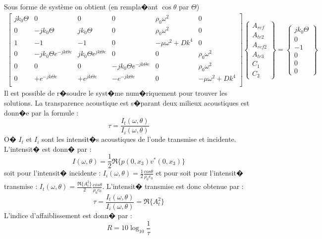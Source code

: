 \documentclass[12pt,foolscap]{report}
\begin{document}
{{Sous forme de système on obtient (en rempla�ant $\cos \theta$ par $\Theta$)
\begin{align}	
\begin{bmatrix}
j k_0 \Theta    &0 & 0 &0&\rho_0\omega^2&0  \\
0       & -j k_0 \Theta & j k_0 \Theta & 0 &\rho_0\omega^2 & 0  \\
1       & -1 & -1 & 0 &-\mu \omega^2+Dk^4 & 0  \\
0    &-j k_0 \Theta e^{-jk\Theta e}   & j k_0 \Theta e^{jk\Theta e}   &0&0&\rho_0\omega^2  \\
0       & 0 & 0 &- j k_0 \Theta e^{-jk\Theta e} &0 & \rho_0\omega^2   \\
0     & + e^{-jk\Theta e} & +e^{jk\Theta e} & - 	e^{-jk\Theta e} &0 & -\mu \omega^2+Dk^4  \\
\end{bmatrix}
\begin{Bmatrix}
A_{ref} \\
A_{tr2} \\
A_{ref2}\\
A_{tr3}\\
C_{1} \\
C_{2} 
\end{Bmatrix}
=\begin{Bmatrix}
j k_0 \Theta \\
0 \\
-1\\
0\\
0 \\
0
\end{Bmatrix}
\end{align}
Il est possible de r�soudre le syst�me num�riquement pour trouver les solutions.
\newpage
La transparence acoustique est s�parant deux milieux acoustiques est donn�e par la formule : 
\begin{equation}
\tau = \frac{I_t(\omega,\theta)}{I_i(\omega,\theta)}
\end{equation}
O� $I_t$ et $I_i$ sont les intensit�s acoustiques de l'onde transmise et incidente.\\
L'intensit� est donn� par :
\begin{equation}
I(\omega,\theta) = \frac{1}{2}\Re\{p(0,x_3)v^*(0,x_3)\}
\end{equation}
soit pour l'intensit� incidente : $I_i(\omega,\theta) = \frac{1}{2}\frac{cos\theta}{\rho_0 c_0}$ et pour soit pour l'intensit� transmise : $I_t(\omega,\theta) =\frac{ \Re\{A_t^2\}}{2}\frac{cos\theta}{\rho_0 c_0}$. L'intensit� transmise est donc obtenue par :
\begin{equation}
\tau = \frac{I_t(\omega,\theta)}{I_i(\omega,\theta)} =\Re \{A_t^2\}
\end{equation}
L'indice d'affaiblissement est donn� par :
\begin{equation}
R = 10\log_{10}\frac{1}{\tau}
\end{equation}

}}
\end{document}
